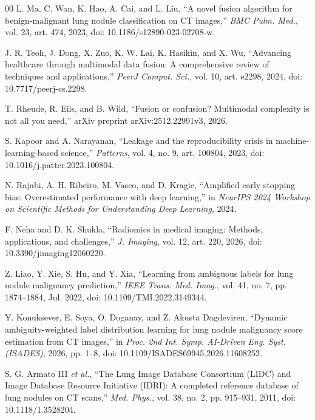 \documentclass[conference]{IEEEtran}
\begin{document}
\begin{thebibliography}{00}
 L. Ma, C. Wan, K. Hao, A. Cai, and L. Liu, ``A novel fusion algorithm for benign-malignant lung nodule classification on CT images,'' \textit{BMC Pulm. Med.}, vol. 23, art. 474, 2023, doi: 10.1186/s12890-023-02708-w.

 J. R. Teoh, J. Dong, X. Zuo, K. W. Lai, K. Hasikin, and X. Wu, ``Advancing healthcare through multimodal data fusion: A comprehensive review of techniques and applications,'' \textit{PeerJ Comput. Sci.}, vol. 10, art. e2298, 2024, doi: 10.7717/peerj-cs.2298.

 T. Rheude, R. Eils, and B. Wild, ``Fusion or confusion? Multimodal complexity is not all you need,'' arXiv preprint arXiv:2512.22991v3, 2026.

 S. Kapoor and A. Narayanan, ``Leakage and the reproducibility crisis in machine-learning-based science,'' \textit{Patterns}, vol. 4, no. 9, art. 100804, 2023, doi: 10.1016/j.patter.2023.100804.

 N. Rajabi, A. H. Ribeiro, M. Vasco, and D. Kragic, ``Amplified early stopping bias: Overestimated performance with deep learning,'' in \textit{NeurIPS 2024 Workshop on Scientific Methods for Understanding Deep Learning}, 2024.

 F. Neha and D. K. Shukla, ``Radiomics in medical imaging: Methods, applications, and challenges,'' \textit{J. Imaging}, vol. 12, art. 220, 2026, doi: 10.3390/jimaging12060220.

 Z. Liao, Y. Xie, S. Hu, and Y. Xia, ``Learning from ambiguous labels for lung nodule malignancy prediction,'' \textit{IEEE Trans. Med. Imag.}, vol. 41, no. 7, pp. 1874--1884, Jul. 2022, doi: 10.1109/TMI.2022.3149344.

 Y. Konuksever, E. Soya, O. Doganay, and Z. Akusta Dagdeviren, ``Dynamic ambiguity-weighted label distribution learning for lung nodule malignancy score estimation from CT images,'' in \textit{Proc. 2nd Int. Symp. AI-Driven Eng. Syst. (ISADES)}, 2026, pp. 1--8, doi: 10.1109/ISADES69945.2026.11608252.

 S. G. Armato III \emph{et al.}, ``The Lung Image Database Consortium (LIDC) and Image Database Resource Initiative (IDRI): A completed reference database of lung nodules on CT scans,'' \textit{Med. Phys.}, vol. 38, no. 2, pp. 915--931, 2011, doi: 10.1118/1.3528204.


\end{thebibliography}
\end{document}
